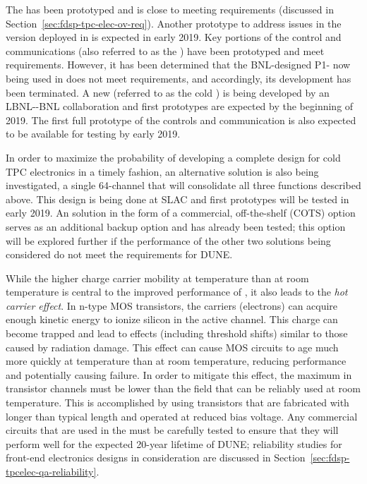 The   has been prototyped and is close to meeting requirements (discussed in Section~\ref{sec:fdsp-tpc-elec-ov-req}). Another prototype to address issues in the version deployed in  is expected in early 2019. Key portions of the control and communications  (also referred to as the  ) have been prototyped and meet requirements.  However, it has been determined that the BNL-designed P1-  now being used in  does not meet requirements, and accordingly, its development has been terminated.  A new   (referred to as the cold  ) is being developed by an LBNL-\fnal-BNL collaboration and first prototypes are expected by the beginning of 2019.  The first full prototype of the controls and communication  is also expected to be available for testing by early 2019.


In order to maximize the probability of developing a complete design for cold TPC  electronics in a timely fashion, an alternative solution is also being investigated, a single \num{64}-channel  that will consolidate all three functions described above.  This design is being done at SLAC and first prototypes will be tested in early 2019.  An  solution in the form of a commercial, off-the-shelf (COTS) option serves as an additional backup option and has already been tested; this option will be explored further if the performance of the other two  solutions being considered do not meet the requirements for DUNE.


While the higher charge carrier mobility at \lar temperature than at room temperature is central to the improved performance of , it also leads to the \textit{hot carrier effect}.  In n-type MOS transistors, the carriers (electrons) can acquire enough kinetic energy to ionize silicon in the active channel.  This charge can become trapped and lead to effects (including threshold shifts) similar to those caused by radiation damage.  This effect can cause MOS circuits to age much more quickly at \lar temperature than at room temperature, reducing performance and potentially causing failure.  In order to mitigate this effect, the maximum \efield in transistor channels must be lower than the field that can be reliably used at room temperature.  This is accomplished by using transistors that are fabricated with longer than typical length and operated at reduced bias voltage.  Any commercial circuits that are used in the \lar must be carefully tested to ensure that they will perform well for the expected \num{20}-year lifetime of DUNE; reliability studies for front-end electronics designs in consideration are discussed in Section~\ref{sec:fdsp-tpcelec-qa-reliability}.

